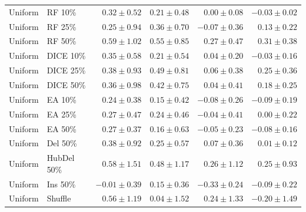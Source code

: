{\begin{longtable}{llrrrr}
Uniform & RF 10\% & $0.32\pm0.52$ & $0.21\pm0.48$ & $0.00\pm0.08$ & $-0.03\pm0.02$ \\
Uniform & RF 25\% & $0.25\pm0.94$ & $0.36\pm0.70$ & $-0.07\pm0.36$ & $0.13\pm0.22$ \\
Uniform & RF 50\% & $0.59\pm1.02$ & $0.55\pm0.85$ & $0.27\pm0.47$ & $0.31\pm0.38$ \\
Uniform & DICE 10\% & $0.35\pm0.58$ & $0.21\pm0.54$ & $0.04\pm0.20$ & $-0.03\pm0.16$ \\
Uniform & DICE 25\% & $0.38\pm0.93$ & $0.49\pm0.81$ & $0.06\pm0.38$ & $0.25\pm0.36$ \\
Uniform & DICE 50\% & $0.36\pm0.98$ & $0.42\pm0.75$ & $0.04\pm0.41$ & $0.18\pm0.25$ \\
Uniform & EA 10\% & $0.24\pm0.38$ & $0.15\pm0.42$ & $-0.08\pm0.26$ & $-0.09\pm0.19$ \\
Uniform & EA 25\% & $0.27\pm0.47$ & $0.24\pm0.46$ & $-0.04\pm0.41$ & $0.00\pm0.22$ \\
Uniform & EA 50\% & $0.27\pm0.37$ & $0.16\pm0.63$ & $-0.05\pm0.23$ & $-0.08\pm0.16$ \\
Uniform & Del 50\% & $0.38\pm0.92$ & $0.25\pm0.57$ & $0.07\pm0.36$ & $0.01\pm0.12$ \\
Uniform & HubDel 50\% & $0.58\pm1.51$ & $0.48\pm1.17$ & $0.26\pm1.12$ & $0.25\pm0.93$ \\
Uniform & Ins 50\% & $-0.01\pm0.39$ & $0.15\pm0.36$ & $-0.33\pm0.24$ & $-0.09\pm0.22$ \\
Uniform & Shuffle & $0.56\pm1.19$ & $0.04\pm1.52$ & $0.24\pm1.33$ & $-0.20\pm1.49$ \\
\end{longtable}
}

